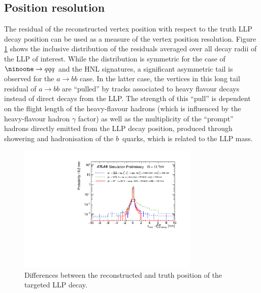 \documentclass[PUB,UKenglish, texlive=2018]{\ATLASLATEXPATH atlasdoc}
\begin{document}
\subsection{Position resolution \label{sec:position_resolution} }

The residual of the reconstructed vertex position with respect to the truth LLP decay position can be used as a measure of the vertex position resolution. 
Figure \ref{fig:residual} shows the inclusive distribution of the residuals averaged over all decay radii of the LLP of interest. 
While the distribution is symmetric for the case of $\ninoone \rightarrow qqq$ and the HNL signatures, a significant asymmetric tail is observed for the $a \rightarrow bb$ case. 
In the latter case, the vertices in this long tail residual of $a \rightarrow bb$ are ``pulled'' by tracks associated to heavy flavour decays instead of direct decays from the LLP.
The strength of this ``pull'' is dependent on the flight length of the heavy-flavour hadrons (which is influenced by the heavy-flavour hadron $\gamma$ factor) 
as well as the multiplicity of the ``prompt'' hadrons directly emitted from the LLP decay position, produced through showering and hadronisation of the $b$~quarks, which is related to the LLP mass.

\begin{figure}[h]
\begin{center}
\includegraphics[width=0.77\textwidth]{figures/final/VSI_positionResolution_inclusive.pdf}
\caption{Differences between the reconstructed and truth position of the targeted LLP decay.}
\label{fig:residual}
\end{center}
\end{figure}
\end{document}
